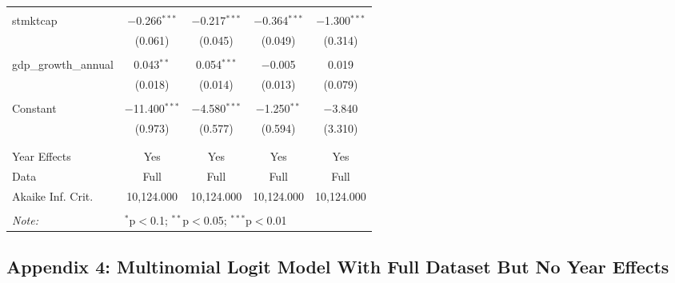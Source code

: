 \documentclass[a4paper,nobind]{templates/ociamthesis}
\begin{document}
\begin{table}[!htbp]
\begin{tabular}{@{\extracolsep{5pt}}lcccc}
  & & & & \\ 
 stmktcap & $-$0.266$^{***}$ & $-$0.217$^{***}$ & $-$0.364$^{***}$ & $-$1.300$^{***}$ \\ 
  & (0.061) & (0.045) & (0.049) & (0.314) \\ 
  & & & & \\ 
 gdp\_growth\_annual & 0.043$^{**}$ & 0.054$^{***}$ & $-$0.005 & 0.019 \\ 
  & (0.018) & (0.014) & (0.013) & (0.079) \\ 
  & & & & \\ 
 Constant & $-$11.400$^{***}$ & $-$4.580$^{***}$ & $-$1.250$^{**}$ & $-$3.840 \\ 
  & (0.973) & (0.577) & (0.594) & (3.310) \\ 
  & & & & \\ 
\hline \\[-1.8ex] 
Year Effects & Yes & Yes & Yes & Yes \\ 
Data & Full & Full & Full & Full \\ 
Akaike Inf. Crit. & 10,124.000 & 10,124.000 & 10,124.000 & 10,124.000 \\ 
\hline 
\hline \\[-1.8ex] 
\textit{Note:}  & \multicolumn{4}{l}{$^{*}$p$<$0.1; $^{**}$p$<$0.05; $^{***}$p$<$0.01} \\ 
\end{tabular} 
\end{table}

\newpage

\hypertarget{appendix-4-multinomial-logit-model-with-full-dataset-but-no-year-effects}{%
\subsection{Appendix 4: Multinomial Logit Model With Full Dataset But No Year Effects}\label{appendix-4-multinomial-logit-model-with-full-dataset-but-no-year-effects}}
\end{document}
